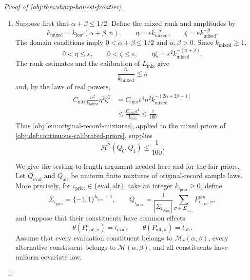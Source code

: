 \documentclass[11pt]{article}
\begin{document}
\begin{proof}[Proof of \cref{obj:thm:sharp-honest-frontier}]
\begin{enumerate}
\item Suppose first that \(\alpha+\beta\le1/2\). Define the mixed rank and amplitudes by
\[
k_{\mathrm{mixed}}=k_{\mathrm{low}}(\alpha+\beta,n),
\qquad
\eta=\varepsilon k_{\mathrm{mixed}}^{-\alpha},
\qquad
\zeta=\varepsilon k_{\mathrm{mixed}}^{-\beta}.
\]
The domain conditions imply \(0<\alpha+\beta\le1/2\) and
\(\alpha,\beta>0\). Since \(k_{\mathrm{mixed}}\ge1\),
\[
0<\eta\le\varepsilon,\qquad 0<\zeta\le\varepsilon,
\qquad
\eta\zeta=\varepsilon^2k_{\mathrm{mixed}}^{-(\alpha+\beta)}.
\]
The rank estimates and the calibration of \(L_{\mathrm{mix}}\) give
\[
\frac{n}{k_{\mathrm{mixed}}}\le\kappa
\]
and, by the laws of real powers,
\[
\begin{aligned}
C_{\mathrm{mix}}\frac{n^2}{k_{\mathrm{mixed}}}\eta^2\zeta^2
&=
C_{\mathrm{mix}}\varepsilon^4
n^2k_{\mathrm{mixed}}^{-(2\alpha+2\beta+1)}\\
&\le
\frac{C_{\mathrm{mix}}\varepsilon^4}{L_{\mathrm{mix}}}
\le\frac1{100}.
\end{aligned}
\]
Thus \cref{obj:lem:original-record-mixtures}, applied to the mixed priors of
\cref{obj:def:continuous-calibrated-priors}, supplies
\[
\mathcal H^2(Q_0,Q_1)\le\frac1{100}.
\]

We give the testing-to-length argument needed here and for the fair priors.
Let \(Q_{\mathrm{eval}}\) and \(Q_{\mathrm{alt}}\) be uniform finite mixtures
of original-record sample laws. More precisely, for
\(\iota_{\mathrm{prior}}\in\{\mathrm{eval},\mathrm{alt}\}\), take an integer \(k_{\iota_{\mathrm{prior}}}\ge0\), define
\[
\Sigma_{\iota_{\mathrm{prior}}}=\{-1,1\}^{k_{\iota_{\mathrm{prior}}}+1},
\qquad
Q_{\iota_{\mathrm{prior}}}=\frac1{|\Sigma_{\iota_{\mathrm{prior}}}|}
\sum_{\sigma\in\Sigma_{\iota_{\mathrm{prior}}}}P_{\iota_{\mathrm{prior}},\sigma}^{\otimes n},
\]
and suppose that their constituents have common effects
\[
\theta(P_{\mathrm{eval},\sigma})=t_{\mathrm{eval}},
\qquad
\theta(P_{\mathrm{alt},\sigma})=t_{\mathrm{alt}}.
\]
Assume that every evaluation constituent belongs to
\(\mathcal M_r(\alpha,\beta)\), every alternative constituent belongs to
\(\mathcal M(\alpha,\beta)\), and all constituents have uniform covariate law.


\end{enumerate}
\end{proof}
\end{document}
